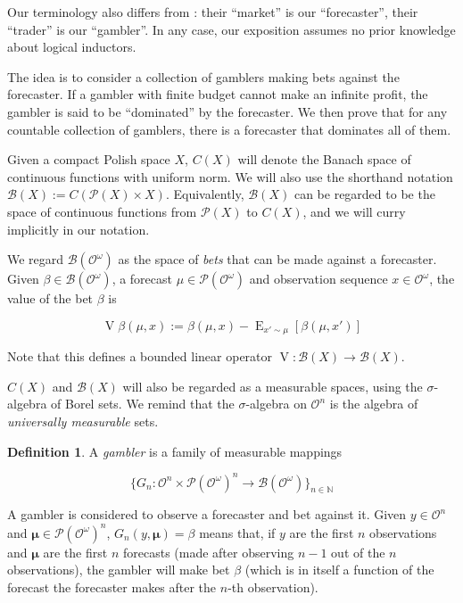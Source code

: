 \documentclass[11pt]{article}
\theoremstyle{definition}
\newtheorem{definition}{Definition}%
\theoremstyle{plain}
\newcommand{\Nats}{\mathbb{N}}
\newcommand{\Sq}[2]{\{#1\}_{#2 \in \Nats}}
\newcommand{\Sqn}[1]{\Sq{#1}{n}}
\DeclareMathOperator{\E}{E}
\newcommand{\PM}{\mathcal{P}}
\newcommand{\Ob}{\mathcal{O}}
\newcommand{\OO}{\Ob^\omega}
\newcommand{\PMO}{\PM(\OO)}
\newcommand{\Gm}{\mathcal{B}}
\newcommand{\GMO}{\Gm(\OO)}
\DeclareMathOperator{\V}{V}
\newcommand{\BM}{\bm{\mu}}
\begin{document}
Our terminology also differs from \cite{Garrabrant_2016}: their \enquote{market} is our \enquote{forecaster}, their \enquote{trader} is our \enquote{gambler}. In any case, our exposition assumes no prior knowledge about logical inductors.

The idea is to consider a collection of gamblers making bets against the forecaster. If a gambler with finite budget cannot make an infinite profit, the gambler is said to be \enquote{dominated} by the forecaster. We then prove that for any countable collection of gamblers, there is a forecaster that dominates all of them.

Given a compact Polish space $X$, $C\left(X\right)$ will denote the Banach space of continuous functions with uniform norm. We will also use the shorthand notation $\Gm\left(X\right):=C\left(\PM\left(X\right) \times X\right)$. Equivalently, $\Gm\left(X\right)$ can be regarded to be the space of continuous functions from $\PM\left(X\right)$ to $C\left(X\right)$, and we will curry implicitly in our notation.

We regard $\GMO$ as the space of \emph{bets} that can be made against a forecaster. Given $\beta \in \GMO$, a forecast $\mu \in \PMO$ and observation sequence $x \in \OO$, the value of the bet $\beta$ is

\begin{equation}
\V{\beta}\left(\mu,x\right):=\beta\left(\mu,x\right) - \E_{x' \sim \mu}\left[\beta\left(\mu,x'\right)\right]
\end{equation}

Note that this defines a bounded linear operator $\V: \Gm\left(X\right) \rightarrow \Gm\left(X\right)$.

$C\left(X\right)$ and $\Gm\left(X\right)$ will also be regarded as a measurable spaces, using the $\sigma$-algebra of Borel sets. We remind that the $\sigma$-algebra on $\Ob^n$ is the algebra of \emph{universally measurable} sets.

\begin{definition}

A \emph{gambler} is a family of measurable mappings

\[\Sqn{G_n : \Ob^n \times \PMO^n \rightarrow \Gm\left(\OO\right)}\]

\end{definition}

A gambler is considered to observe a forecaster and bet against it. Given $y \in \Ob^n$ and $\BM \in \PMO^n$, $G_n\left(y,\BM\right)=\beta$ means that, if $y$ are the first $n$ observations and $\BM$ are the first $n$ forecasts (made after observing $n-1$ out of the $n$ observations), the gambler will make bet $\beta$ (which is in itself a function of the forecast the forecaster makes after the $n$-th observation).
\end{document}
